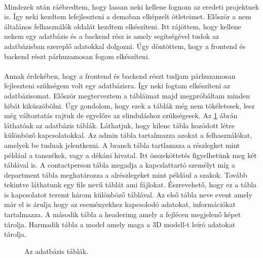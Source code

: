 \documentclass{article}
\begin{document}
	\paragraph{}
	Mindezek után ráébredtem, hogy lassan neki kellene fognom az eredeti projektnek is. Így neki kezdtem lefejleszteni a demoban elképzelt ötleteimet. Először a nem általános felhasználók oldalát kezdtem elkészíteni. Itt rájöttem, hogy kellene nekem egy adatbázis és a backend rész is amely segítségével tudok az adatbázisban szereplő adatokkal dolgozni. Úgy döntöttem, hogy a frontend és backend részt párhuzamosan fogom elkészíteni.
	\paragraph{}
	Annak érdekében, hogy a frontend és backend részt tudjam párhuzamosan fejleszteni szükségem volt egy adatbázisra. Így neki fogtam elkészíteni az adatbázisomat. Először megterveztem a tábláimat majd megpróbáltam minden hibát kiküszöbölni. Úgy gondolom, hogy ezek a táblák még nem tökéletesek, lesz még változtatás rajtuk de egyelőre az elinduláshoz szükségesek. Az \ref{fig:database} ábrán láthatóak az adatbázis táblák. Láthatjuk, hogy kilenc tábla hozódott létre különböző kapcsolatokkal. Az admin tábla tartalmazza azokat a felhasználókat, amelyek be tudnak jelentkezni. A branch tábla tartlamzza a részlegket mint például a tanszékek, vagy a dékáni hivatal. Itt összeköttetés figyelhetünk meg két táblával is. A contactperson tábla megadja a kapcslattartó személyt míg a department tábla meghatározza a alrészlegeket mint például a szakok. Tovább tekintve láthatunk egy file nevű táblát ami fájlokat. Észrevehető, hogy ez a tábla is kapcsolatot teremt három különböző táblával. Az első tábla neve event amely már el is árulja hogy az eseményekhez kapcsolodó adatokat, információkat tartalmazza. A második tábla a headerimg amely a fejlécen megjelenő képet tárolja. Harmadik tábla a model amely maga a 3D modell-t leíró adatokat tárolja.
	\begin{figure}
		\centering
		\caption{Az adatbázis táblák.}
		\label{fig:database}
	\end{figure}
\end{document}
